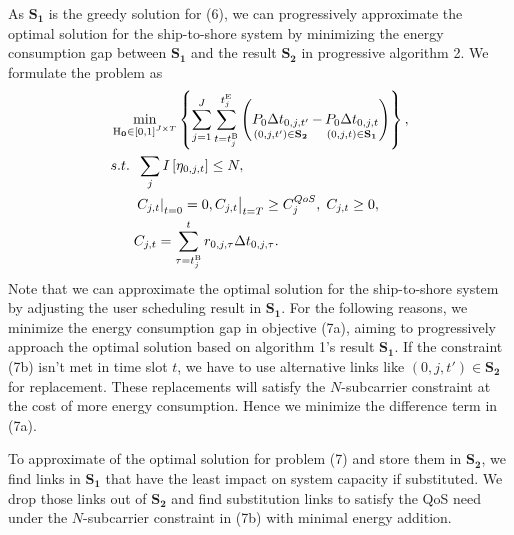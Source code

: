 \documentclass[conference]{IEEEtran}
\begin{document}
As ${{\mathbf{S}}_{\mathbf{1}}}$ is the greedy solution for (6), we can progressively approximate the optimal solution for the ship-to-shore system by minimizing the energy consumption gap between ${{\mathbf{S}}_{\mathbf{1}}}$ and the result ${{\mathbf{S}}_{\mathbf{2}}}$ in progressive algorithm 2. We formulate the problem as
\begin{subequations}
\begin{align}
  & \mathop {\min }\limits_{{{\mathbf{{\rm H}}}_{\mathbf{0}}} \in {{\left[ {0,1} \right]}^{J \times T}}} \left\{ {\sum\limits_{j = 1}^J {\sum\limits_{t = {t_j^{{\rm{B}}}}}^{t_j^{{\rm{E}}}} {\left( {\mathop {{P_{0}}\Delta t_{0,j,t'} }\limits_{\left( {0,j,t'} \right) \in {{\mathbf{S}}_{\mathbf{2}}}}  - \mathop {{P_{0}} \Delta t_{0,j,t} }\limits_{\left( {0,j,t} \right) \in {{\mathbf{S}}_{\mathbf{1}}}} } \right)}} } \right\}, \\
  & {s.t.} \;\; \sum\limits_j  { I\left[ {{\eta _{0,j,t}}} \right] }  \le N, \\
& \;\;\;\;\;\; {\left. {{{\left. {{C_{j,t}}} \right|}_{t = 0}} = 0, {C_{j,t}}} \right|_{t = T}} \ge C_j^{QoS},\; {C_{j,t}} \ge 0, \\
& \;\;\;\;\;\; {C_{j,t}} = \sum\limits_{\tau  = {t_j^{{\rm{B}}}}}^t {{r_{0,j,\tau }}\Delta t_{0,j,\tau} }.
\end{align}
\end{subequations}
Note that we can approximate the optimal solution for the ship-to-shore system by adjusting the user scheduling result in ${{\mathbf{S}}_{\mathbf{1}}}$. For the following reasons, we minimize the energy consumption gap in objective (7a), aiming to progressively approach the optimal solution based on algorithm 1's result ${{\mathbf{S}}_{\mathbf{1}}}$. 
If the constraint (7b) isn't met in time slot ${t}$, we have to use alternative links like $\left( {0,j,t'} \right) \in {{\mathbf{S}}_{\mathbf{2}}}$ for replacement. These replacements will satisfy the $N$-subcarrier constraint at the cost of more energy consumption. Hence we minimize the difference term in (7a). %


To approximate of the optimal solution for problem (7) and store them in ${{\mathbf{S}}_{\mathbf{2}}}$, we find links in ${{\mathbf{S}}_{\mathbf{1}}}$ that have the least impact on system capacity if substituted. We drop those links out of ${{\mathbf{S}}_{\mathbf{2}}}$ and find substitution links to satisfy the QoS need under the $N$-subcarrier constraint in (7b) with minimal energy addition. 
\end{document}
